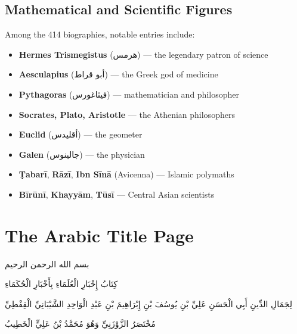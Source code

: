 \documentclass[11pt,a4paper]{article}
\def\RL#1{\beginR#1\endR}
\newcommand{\arabicblock}[1]{{\arabicfont\RL{#1}}}
\newcommand{\textarabic}[1]{{\arabicfont\RL{#1}}}
\begin{document}
\subsection*{Mathematical and Scientific Figures}

Among the 414 biographies, notable entries include:
\begin{itemize}[leftmargin=2em]
  \item \textbf{Hermes Trismegistus} (\textarabic{هرمس}) --- the legendary patron of science
  \item \textbf{Aesculapius} (\textarabic{أبو قراط}) --- the Greek god of medicine
  \item \textbf{Pythagoras} (\textarabic{فيثاغورس}) --- mathematician and philosopher
  \item \textbf{Socrates, Plato, Aristotle} --- the Athenian philosophers
  \item \textbf{Euclid} (\textarabic{أقليدس}) --- the geometer
  \item \textbf{Galen} (\textarabic{جالينوس}) --- the physician
  \item \textbf{Ṭabarī}, \textbf{Rāzī}, \textbf{Ibn Sīnā} (Avicenna) --- Islamic polymaths
  \item \textbf{Bīrūnī}, \textbf{Khayyām}, \textbf{Tūsī} --- Central Asian scientists
\end{itemize}

\newpage

\section*{The Arabic Title Page}

\begin{center}
\arabicblock{%
بسم الله الرحمن الرحيم

\vspace{1cm}

كِتَابُ إِخْبَارِ الْعُلَمَاءِ بِأَخْبَارِ الْحُكَمَاءِ

\vspace{0.5cm}

لِجَمَالِ الدِّينِ أَبِي الْحَسَنِ عَلِيِّ بْنِ يُوسُفَ بْنِ إِبْرَاهِيمَ بْنِ عَبْدِ الْوَاحِدِ الشَّيْبَانِيِّ الْقِفْطِيِّ

\vspace{0.5cm}

مُخْتَصَرُ الزَّوْزَنِيِّ وَهُوَ مُحَمَّدُ بْنُ عَلِيٍّ الْخَطِيبُ%
}
\end{center}
\end{document}

